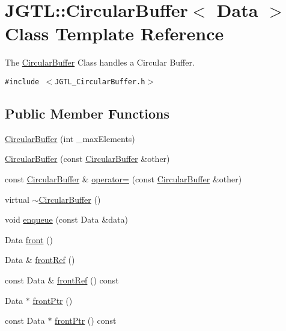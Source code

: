 \hypertarget{class_j_g_t_l_1_1_circular_buffer}{
\section{JGTL::Circular\-Buffer$<$ Data $>$ Class Template Reference}
\label{class_j_g_t_l_1_1_circular_buffer}
}
The \hyperlink{class_j_g_t_l_1_1_circular_buffer}{Circular\-Buffer} Class handles a Circular Buffer.  


{\tt \#include $<$JGTL\_\-Circular\-Buffer.h$>$}

\subsection*{Public Member Functions}
\begin{CompactItemize}
\item 
\hyperlink{class_j_g_t_l_1_1_circular_buffer_31ecf77c576edebf19374d8f7add1966}{Circular\-Buffer} (int \_\-max\-Elements)
\item 
\hyperlink{class_j_g_t_l_1_1_circular_buffer_80c110bbff22c6b3f49fd62601b803f6}{Circular\-Buffer} (const \hyperlink{class_j_g_t_l_1_1_circular_buffer}{Circular\-Buffer} \&other)
\item 
const \hyperlink{class_j_g_t_l_1_1_circular_buffer}{Circular\-Buffer} \& \hyperlink{class_j_g_t_l_1_1_circular_buffer_dbe37093f8c1572f1bd05d2eb8de9be9}{operator=} (const \hyperlink{class_j_g_t_l_1_1_circular_buffer}{Circular\-Buffer} \&other)
\item 
virtual \hyperlink{class_j_g_t_l_1_1_circular_buffer_7b284dd4b559c45774cd46d2bd10c6d8}{$\sim$Circular\-Buffer} ()
\item 
void \hyperlink{class_j_g_t_l_1_1_circular_buffer_1f74d2cd67aa2c9db0b2ca389313dcff}{enqueue} (const Data \&data)
\item 
Data \hyperlink{class_j_g_t_l_1_1_circular_buffer_a428dabc69ba27d87402edeac3f45df9}{front} ()
\item 
Data \& \hyperlink{class_j_g_t_l_1_1_circular_buffer_22ac3344de0e92167193f4133156c117}{front\-Ref} ()
\item 
const Data \& \hyperlink{class_j_g_t_l_1_1_circular_buffer_1fc217fbac47f045aeb79de7a98bf6fb}{front\-Ref} () const
\item 
Data $\ast$ \hyperlink{class_j_g_t_l_1_1_circular_buffer_9dd2e9b9f34e1aa2f09d2b9a8e756cad}{front\-Ptr} ()
\item 
const Data $\ast$ \hyperlink{class_j_g_t_l_1_1_circular_buffer_672e8efab885d22536a3c8b4c80abf07}{front\-Ptr} () const

\end{CompactItemize}
